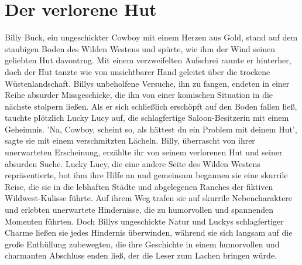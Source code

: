 \documentclass[12pt]{article} %
\begin{document}
\clearpage
\tableofcontents
\clearpage


\section{ Der verlorene Hut }
\begin{minipage}{\textwidth}
    Billy Buck, ein ungeschickter Cowboy mit einem Herzen aus Gold, stand auf dem staubigen Boden des Wilden Westens und spürte, wie ihm der Wind seinen geliebten Hut davontrug. Mit einem verzweifelten Aufschrei rannte er hinterher, doch der Hut tanzte wie von unsichtbarer Hand geleitet über die trockene Wüstenlandschaft. Billys unbeholfene Versuche, ihn zu fangen, endeten in einer Reihe absurder Missgeschicke, die ihn von einer komischen Situation in die nächste stolpern ließen. Als er sich schließlich erschöpft auf den Boden fallen ließ, tauchte plötzlich Lucky Lucy auf, die schlagfertige Saloon-Besitzerin mit einem Geheimnis. 'Na, Cowboy, scheint so, als hättest du ein Problem mit deinem Hut', sagte sie mit einem verschmitzten Lächeln. Billy, überrascht von ihrer unerwarteten Erscheinung, erzählte ihr von seinem verlorenen Hut und seiner absurden Suche. Lucky Lucy, die eine andere Seite des Wilden Westens repräsentierte, bot ihm ihre Hilfe an und gemeinsam begannen sie eine skurrile Reise, die sie in die lebhaften Städte und abgelegenen Ranches der fiktiven Wildwest-Kulisse führte. Auf ihrem Weg trafen sie auf skurrile Nebencharaktere und erlebten unerwartete Hindernisse, die zu humorvollen und spannenden Momenten führten. Doch Billys ungeschickte Natur und Luckys schlagfertiger Charme ließen sie jedes Hindernis überwinden, während sie sich langsam auf die große Enthüllung zubewegten, die ihre Geschichte in einem humorvollen und charmanten Abschluss enden ließ, der die Leser zum Lachen bringen würde.
\end{minipage}
\end{document}
